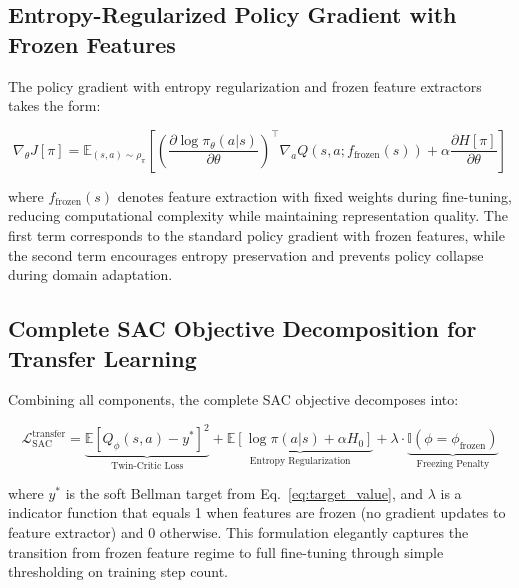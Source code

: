 \documentclass[10pt,twocolumn,letterpaper]{article}
\begin{document}
\subsection{Entropy-Regularized Policy Gradient with Frozen Features}

The policy gradient with entropy regularization and frozen feature extractors takes the form:

\begin{equation}
    \nabla_\theta J[\pi] = \mathbb{E}_{(s,a) \sim \rho_\pi}\left[\left(\frac{\partial \log\pi_\theta(a|s)}{\partial \theta}\right)^\top\nabla_a Q(s,a;f_\text{frozen}(s)) + \alpha\frac{\partial H[\pi]}{\partial \theta}\right]
    \label{eq:policy_gradient_frozen}
\end{equation}

where $f_\text{frozen}(s)$ denotes feature extraction with fixed weights during fine-tuning, reducing computational complexity while maintaining representation quality. The first term corresponds to the standard policy gradient with frozen features, while the second term encourages entropy preservation and prevents policy collapse during domain adaptation.

\subsection{Complete SAC Objective Decomposition for Transfer Learning}

Combining all components, the complete SAC objective decomposes into:

\begin{equation}
    \mathcal{L}_\text{SAC}^\text{transfer} = \underbrace{\mathbb{E}\left[Q_\phi(s,a) - y^*\right]^2}_{\text{Twin-Critic Loss}} + \underbrace{\mathbb{E}\left[\log\pi(a|s) + \alpha H_0\right]}_{\text{Entropy Regularization}} + \lambda\cdot\underbrace{\mathbb{I}(\phi=\phi_\text{frozen})}_{\text{Freezing Penalty}}
    \label{eq:complete_sac_transfer}
\end{equation}

where $y^*$ is the soft Bellman target from Eq.~\eqref{eq:target_value}, and $\lambda$ is a indicator function that equals 1 when features are frozen (no gradient updates to feature extractor) and 0 otherwise. This formulation elegantly captures the transition from frozen feature regime to full fine-tuning through simple thresholding on training step count.

\end{document}
